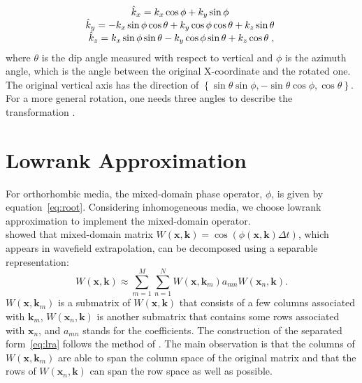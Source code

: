 \begin{equation}
\label{eq:wavenumber}
\begin{array}{*{20}c}
\hat{k}_x=k_x\cos{\phi}+k_y\sin{\phi}\;\\ 
\hat{k}_y=-k_x\sin{\phi}\cos{\theta}+k_y\cos{\phi}\cos{\theta}+k_z\sin{\theta}\;\\ 
\hat{k}_z=k_x\sin{\phi}\sin{\theta}-k_y\cos{\phi}\sin{\theta}+k_z\cos{\theta}\;,\\ 
 \end{array}
\end{equation}
where $\theta$ is the dip angle measured with respect to vertical and 
$\phi$ is the azimuth angle, which is the angle between the original X-coordinate 
and the rotated one. 
The original vertical axis has the direction of $\left\{\sin\theta\sin\phi,-\sin\theta\cos\phi,\cos\theta\right\}$.
For a more general rotation, 
one needs three angles to describe the transformation \cite[]{zhangor}.
\\



\section{Lowrank Approximation}

For orthorhombic media, the mixed-domain phase operator, $\phi$, is given by equation~\ref{eq:root}.
Considering inhomogeneous media, we choose lowrank approximation \cite[]{ying,lr} to implement the mixed-domain operator.\\

\cite{ying,lr} showed that mixed-domain matrix 
$W(\mathbf{x},\mathbf{k})=\cos(\phi(\mathbf{x},\mathbf{k})\Delta t)$, which appears in wavefield extrapolation, 
can be decomposed using a separable representation:
\begin{equation}
  \label{eq:lra}
  W(\mathbf{x},\mathbf{k}) \approx \sum\limits_{m=1}^M \sum\limits_{n=1}^N W(\mathbf{x},\mathbf{k}_m) a_{mn} W(\mathbf{x}_n,\mathbf{k}).
\end{equation}
$W(\mathbf{x},\mathbf{k}_m)$ is a submatrix of $W(\mathbf{x},\mathbf{k})$ that consists of a few columns associated with ${\mathbf{k}_m}$,
$W(\mathbf{x}_n,\mathbf{k})$ is another submatrix that contains some rows associated with ${\mathbf{x}_n}$,
and $a_{mn}$ stands for the coefficients.
The construction of the separated form~\ref{eq:lra} follows the method of \cite{eng2009}.
The main observation is that the columns of $W(\mathbf{x},\mathbf{k}_m)$ are able to span the column space of the original matrix and that the rows of $W(\mathbf{x}_n,\mathbf{k})$ can span the row space as well as possible.\\

